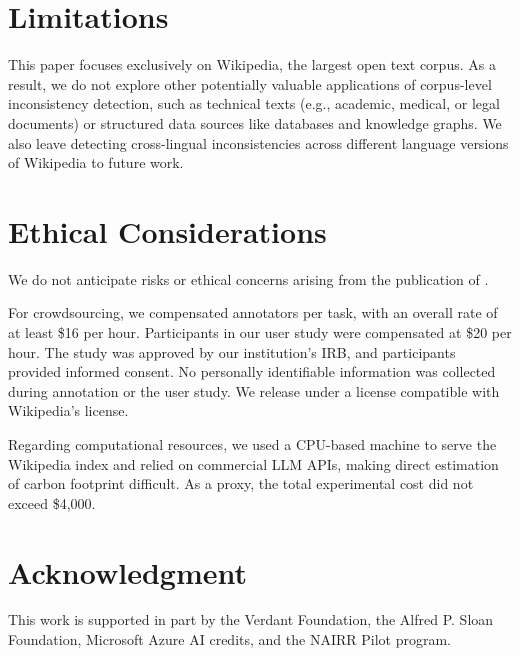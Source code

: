 \section*{Limitations}
This paper focuses exclusively on Wikipedia, the largest open text corpus. As a result, we do not explore other potentially valuable applications of corpus-level inconsistency detection, such as technical texts (e.g., academic, medical, or legal documents) or structured data sources like databases and knowledge graphs. We also leave detecting cross-lingual inconsistencies across different language versions of Wikipedia to future work.

\section*{Ethical Considerations}
We do not anticipate risks or ethical concerns arising from the publication of \dataset.

For crowdsourcing, we compensated annotators per task, with an overall rate of at least \$16 per hour. Participants in our user study were compensated at \$20 per hour. The study was approved by our institution's IRB, and participants provided informed consent. No personally identifiable information was collected during annotation or the user study. We release \dataset under a license compatible with Wikipedia's license.

Regarding computational resources, we used a CPU-based machine to serve the Wikipedia index and relied on commercial LLM APIs, making direct estimation of carbon footprint difficult. As a proxy, the total experimental cost did not exceed \$4,000.

\section*{Acknowledgment}
This work is supported in part by the Verdant Foundation, the Alfred P. Sloan Foundation, Microsoft Azure AI credits, and the NAIRR Pilot program.
